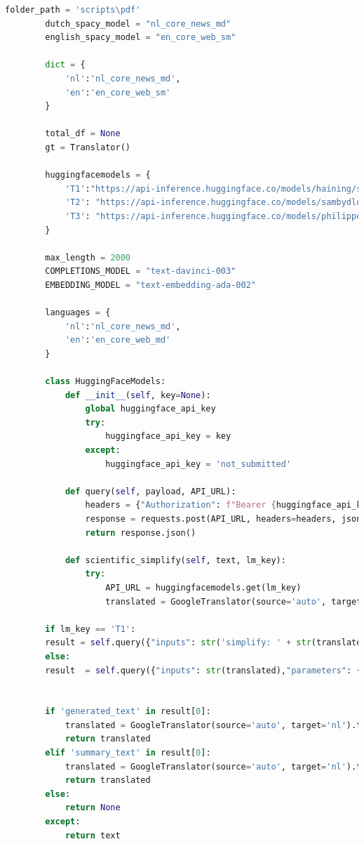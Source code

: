\begin{center}
	\begin{lstlisting}[language=Python, caption={Script voor de derde fase van de vergelijkende studie}, label={code:verg-studie-phase-3}]		
		folder_path = 'scripts\pdf'
		dutch_spacy_model = "nl_core_news_md"
		english_spacy_model = "en_core_web_sm"
		
		dict = {
			'nl':'nl_core_news_md',
			'en':'en_core_web_sm'
		}
		
		total_df = None
		gt = Translator()
		
		huggingfacemodels = {
			'T1':"https://api-inference.huggingface.co/models/haining/scientific_abstract_simplification",
			'T2': "https://api-inference.huggingface.co/models/sambydlo/bart-large-scientific-lay-summarisation",
			'T3': "https://api-inference.huggingface.co/models/philippelaban/keep_it_simple"
		}
		
		max_length = 2000
		COMPLETIONS_MODEL = "text-davinci-003"
		EMBEDDING_MODEL = "text-embedding-ada-002"
		
		languages = {
			'nl':'nl_core_news_md',
			'en':'en_core_web_md'
		}
		
		class HuggingFaceModels:
			def __init__(self, key=None):
				global huggingface_api_key
				try:
					huggingface_api_key = key
				except:
					huggingface_api_key = 'not_submitted'
				
			def query(self, payload, API_URL):
				headers = {"Authorization": f"Bearer {huggingface_api_key}"}
				response = requests.post(API_URL, headers=headers, json=payload)
				return response.json()
			
			def scientific_simplify(self, text, lm_key):
				try:
					API_URL = huggingfacemodels.get(lm_key)
					translated = GoogleTranslator(source='auto', target='en').translate(str(text))
				
		if lm_key == 'T1':
		result = self.query({"inputs": str('simplify: ' + str(translated)),"parameters": {"max_length": len(sentence)+10},"options":{"wait_for_model":True}}, API_URL)
		else:
		result  = self.query({"inputs": str(translated),"parameters": {"max_length": len(sentence)+10},"options":{"wait_for_model":True}}, API_URL)
		
		
		if 'generated_text' in result[0]:
			translated = GoogleTranslator(source='auto', target='nl').translate(str(result[0]['generated_text']))
			return translated
		elif 'summary_text' in result[0]:
			translated = GoogleTranslator(source='auto', target='nl').translate(str(result[0]['summary_text']))
			return translated
		else:
			return None
		except:
			return text
		

\end{lstlisting}
\end{center}
